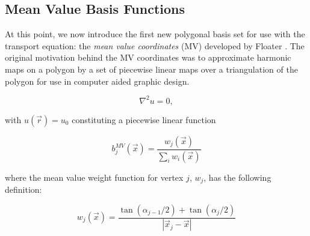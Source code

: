 \subsection{Mean Value Basis Functions}
\label{sec::BF_2DLinear_MV}

At this point, we now introduce the first new polygonal basis set for use with the transport equation: the {\em mean value coordinates} (MV) developed by Floater \cite{floater2003mean,hormann2006mean}. The original motivation behind the MV coordinates was to approximate harmonic maps on a polygon by a set of piecewise linear maps over a triangulation of the polygon for use in computer aided graphic design.

\begin{equation}
\label{eq::BF_MV_laplace}
\nabla^2 u = 0 ,
\end{equation}

\noindent with $u(\vec{r}) = u_0$ constituting a piecewise linear function 

\begin{equation}
\label{eq::BF_MV_BF}
b_{j}^{MV} (\vec{x}) = \frac{w_j (\vec{x}) }{\sum_i w_i (\vec{x})}
\end{equation}

\noindent where the mean value weight function for vertex $j$, $w_j$, has the following definition:

\begin{equation}
\label{eq::BF_MV_weights}
w_j (\vec{x})  = \frac{\tan(\alpha_{j-1} / 2) + \tan(\alpha_j / 2)}{|\vec{x}_j - \vec{x}|}
\end{equation}

